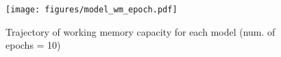 \begin{figure}[t]
 \centering
  \texttt{[image: figures/model\_wm\_epoch.pdf]}
 \caption{Trajectory of working memory capacity for each model (num. of epochs = 10)}
 \label{fig:wm_curves}
\end{figure}

